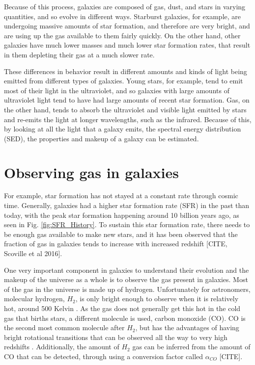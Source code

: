 \documentclass[twoside,single]{lion-msc}
\begin{document}
Because of this process, galaxies are composed of gas, dust, and stars in varying quantities, and so evolve in different ways. Starburst galaxies, for example, are undergoing massive amounts of star formation, and therefore are very bright, and are using up the gas available to them fairly quickly. On the other hand, other galaxies have much lower masses and much lower star formation rates, that result in them depleting their gas at a much slower rate.

These differences in behavior result in different amounts and kinds of light being emitted from different types of galaxies. Young stars, for example, tend to emit most of their light in the ultraviolet, and so galaxies with large amounts of ultraviolet light tend to have had large amounts of recent star formation. Gas, on the other hand, tends to absorb the ultraviolet and visible light emitted by stars and re-emits the light at longer wavelengths, such as the infrared. Because of this, by looking at all the light that a galaxy emits, the spectral energy distribution (SED), the properties and makeup of a galaxy can be estimated.

\section{Observing gas in galaxies}

For example, star formation has not stayed at a constant rate through cosmic time. Generally, galaxies had a higher star formation rate (SFR) in the past than today, with the peak star formation happening around 10 billion years ago, as seen in Fig. \ref{fig:SFR_History}. To sustain this star formation rate, there needs to be enough gas available to make new stars, and it has been observed that the fraction of gas in galaxies tends to increase with increased redshift [CITE, Scoville et al 2016]. 

One very important component in galaxies to understand their evolution and the makeup of the universe as a whole is to observe the gas present in galaxies. Most of the gas in the universe is made up of hydrogen. Unfortunately for astronomers, molecular hydrogen, $H_2$, is only bright enough to observe when it is relatively hot, around 500 Kelvin \cite{decarli2019alma}. As the gas does not generally get this hot in the cold gas that births stars, a different molecule is used, carbon monoxide (CO). CO is the second most common molecule after $H_2$, but has the advantages of having bright rotational transitions that can be observed all the way to very high redshifts \cite{walter2016alma, decarli2019alma}. Additionally, the amount of $H_2$ gas can be inferred from the amount of CO that can be detected, through using a conversion factor called $\alpha_{CO}$ [CITE]. 
\end{document}

